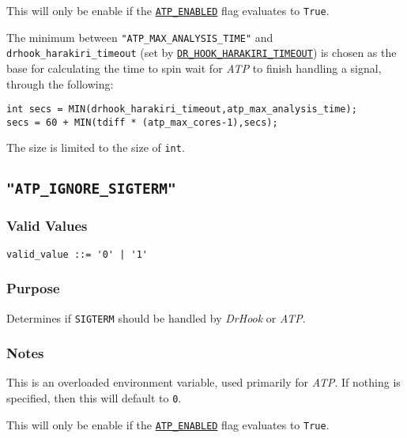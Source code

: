 This will only be enable if the \hyperref[section:flags:ATP_ENABLED]{\texttt{ATP\_ENABLED}} flag evaluates to \verb|True|.

The minimum between \texttt{"ATP\_MAX\_ANALYSIS\_TIME"} and \texttt{drhook\_harakiri\_timeout} (set by \hyperref[section:flags:DR_HOOK_HARAKIRI_TIMEOUT]{\texttt{DR\_HOOK\_HARAKIRI\_TIMEOUT}}) is chosen as the base for calculating the time to spin wait for \textit{ATP} to finish handling a signal, through the following:

\verb|int secs = MIN(drhook_harakiri_timeout,atp_max_analysis_time);|\\
\verb|secs = 60 + MIN(tdiff * (atp_max_cores-1),secs);|

The size is limited to the size of \verb|int|.



\subsection{\texttt{"ATP\_IGNORE\_SIGTERM"}}
\label{section:flags:ATP_IGNORE_SIGTERM}
\vspace{-2ex}
\subsubsection{Valid Values}
\vspace{-2ex}
\verb+valid_value ::= '0' | '1'+ 

\vspace{-2ex}
\subsubsection{Purpose}
\vspace{-2ex}
Determines if \texttt{SIGTERM} should be handled by \textit{DrHook} or \textit{ATP}.

\vspace{-2ex}
\subsubsection{Notes}
\vspace{-2ex}
This is an overloaded environment variable, used primarily for \textit{ATP}. If nothing is specified, then this will default to \texttt{0}.

This will only be enable if the \hyperref[section:flags:ATP_ENABLED]{\texttt{ATP\_ENABLED}} flag evaluates to \verb|True|.

